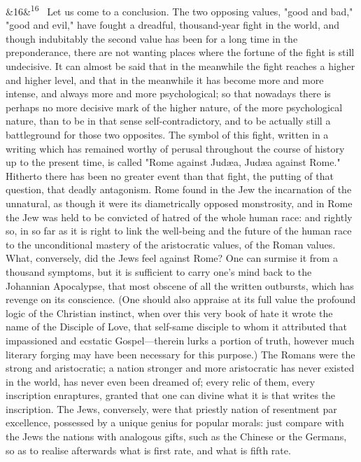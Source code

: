 \documentclass[12pt]{article}
\newcommand{\para}[1][]{\par\noindent\ifx&#1&\else\textsuperscript{\footnotesize #1}~\fi}
\begin{document}
\para[16] Let us come to a conclusion. The two opposing values, "good and bad," "good and evil," have fought a dreadful, thousand-year fight in the world, and though indubitably the second value has been for a long time in the preponderance, there are not wanting places where the fortune of the fight is still undecisive. It can almost be said that in the meanwhile the fight reaches a higher and higher level, and that in the meanwhile it has become more and more intense, and always more and more psychological; so that nowadays there is perhaps no more decisive mark of the higher nature, of the more psychological nature, than to be in that sense self-contradictory, and to be actually still a battleground for those two opposites. The symbol of this fight, written in a writing which has remained worthy of perusal throughout the course of history up to the present time, is called "Rome against Judæa, Judæa against Rome." Hitherto there has been no greater event than that fight, the putting of that question, that deadly antagonism. Rome found in the Jew the incarnation of the unnatural, as though it were its diametrically opposed monstrosity, and in Rome the Jew was held to be convicted of hatred of the whole human race: and rightly so, in so far as it is right to link the well-being and the future of the human race to the unconditional mastery of the aristocratic values, of the Roman values. What, conversely, did the Jews feel against Rome? One can surmise it from a thousand symptoms, but it is sufficient to carry one's mind back to the Johannian Apocalypse, that most obscene of all the written outbursts, which has revenge on its conscience. (One should also appraise at its full value the profound logic of the Christian instinct, when over this very book of hate it wrote the name of the Disciple of Love, that self-same disciple to whom it attributed that impassioned and ecstatic Gospel---therein lurks a portion of truth, however much literary forging may have been necessary for this purpose.) The Romans were the strong and aristocratic; a nation stronger and more aristocratic has never existed in the world, has never even been dreamed of; every relic of them, every inscription enraptures, granted that one can divine what it is that writes the inscription. The Jews, conversely, were that priestly nation of resentment par excellence, possessed by a unique genius for popular morals: just compare with the Jews the nations with analogous gifts, such as the Chinese or the Germans, so as to realise afterwards what is first rate, and what is fifth rate.
\end{document}
